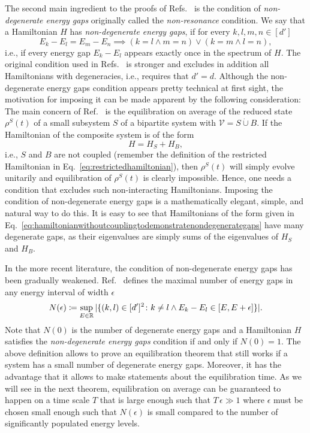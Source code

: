 \documentclass[a4paper,12pt,listof=totoc,index=totoc,bibliography=totoc,headsepline=false,headings=normal,BCOR16.153846mm,DIV12,headinclude,twoside,cleardoublepage=empty,numbers=noenddot,final]{scrreprt}
\theoremstyle{mystyle}
\numberwithin{equation}{section}
\numberwithin{figure}{section}
\numberwithin{lemma}{section}
\numberwithin{theorem}{section}
\numberwithin{corollary}{section}
\numberwithin{definition}{section}
\numberwithin{conjecture}{section}
\numberwithin{observation}{section}
\newcommand{\+}{\mkern2mu}
\newcommand{\coloneqq}{\mathrel{\vcentcolon\mkern-1.2mu=}} %
\newcommand{\dunion}{\mathbin{\dot{\cup}}}
\newcommand{\texteqref}[1]{Eq.~\eqref{#1}}
\newcommand{\suchthat}{\colon}
\renewcommand{\H}{H}
\newcommand{\Vset}{\mathcal{V}}
\DeclareMathOperator{\1}{\mathds{1}}
\newcommand{\mb}[1]{\mathbb{#1}}
\newcommand{\R}{\mb{R}}
\begin{document}
The second main ingredient to the proofs of Refs.~\cite{vonneumann1929,tasaki98,Reimann08,Linden09} is the condition of \emph{non-degenerate energy gaps} originally called the \emph{non-resonance} condition.
We say that a Hamiltonian $\H$ has \emph{non-degenerate energy gaps}, if for every $k,l,m,n \in [d']$
\begin{equation}
  E_k - E_l = E_m - E_n \implies (k = l \land m = n) \lor (k=m \land l=n) ,
\end{equation}
i.e., if every energy gap $E_k - E_l$ appears exactly once in the spectrum of $\H$.
The original condition used in Refs.~\cite{vonneumann1929,tasaki98,Reimann08,Linden09} is stronger and excludes in addition all Hamiltonians with degeneracies, i.e., requires that $d' = d$.
Although the non-degenerate energy gaps condition appears pretty technical at first sight, the motivation for imposing it can be made apparent by the following consideration:
The main concern of Ref.~\cite{Linden09} is the equilibration on average of the reduced state $\rho^S(t)$ of a small subsystem $S$ of a bipartite system with $\Vset = S \dunion B$.
If the Hamiltonian of the composite system is of the form
\begin{equation} \label{eq:hamiltonianwithoutcouplingtodemonstratenondegenerategaps}
  \H = \H_S + H_B ,
\end{equation}
i.e., $S$ and $B$ are not coupled (remember the definition of the restricted Hamiltonian in \texteqref{eq:restrictedhamiltonian}), then $\rho^S(t)$ will simply evolve unitarily and equilibration of $\rho^S(t)$ is clearly impossible.
Hence, one needs a condition that excludes such non-interacting Hamiltonians.
Imposing the condition of non-degenerate energy gaps is a mathematically elegant, simple, and natural way to do this.
It is easy to see that Hamiltonians of the form given in \texteqref{eq:hamiltonianwithoutcouplingtodemonstratenondegenerategaps} have many degenerate gaps, as their eigenvalues are simply sums of the eigenvalues of $\H_S$ and $\H_B$.

In the more recent literature, the condition of non-degenerate energy gaps has been gradually weakened.
Ref.~\cite{1110.5759v1} defines the maximal number of energy gaps in any energy interval of width $\epsilon$
\begin{equation}\label{eq:numeberofalmostdegenerategaps}
  N(\epsilon) \coloneqq \sup_{E \in \R} |\{(k,l) \in [d']^2\suchthat k\neq l \land E_k - E_l \in [E,E+\epsilon] \}| .
\end{equation}
Note that $N(0)$ is the number of degenerate energy gaps and a Hamiltonian $\H$ satisfies the \emph{non-degenerate energy gaps} condition if and only if $N(0) = 1$.
The above definition allows to prove an equilibration theorem that still works if a system has a small number of degenerate energy gaps.
Moreover, it has the advantage that it allows to make statements about the equilibration time.
As we will see in the next theorem, equilibration on average can be guaranteed to happen on a time scale $T$ that is large enough such that $T\,\epsilon \gg 1$ where $\epsilon$ must be chosen small enough such that $N(\epsilon)$ is small compared to the number of significantly populated energy levels.
\end{document}
